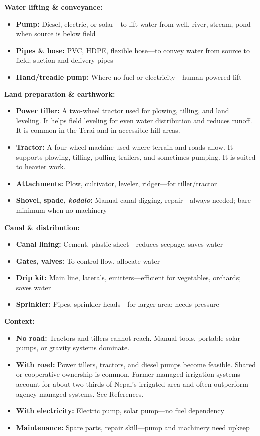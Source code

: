 \documentclass[11pt,a4paper]{article}
\begin{document}
\textbf{Water lifting \& conveyance:}
\begin{itemize}
    \item \textbf{Pump:} Diesel, electric, or solar---to lift water from well, river, stream, pond when source is below field
    \item \textbf{Pipes \& hose:} PVC, HDPE, flexible hose---to convey water from source to field; suction and delivery pipes
    \item \textbf{Hand/treadle pump:} Where no fuel or electricity---human-powered lift
\end{itemize}

\textbf{Land preparation \& earthwork:}
\begin{itemize}
    \item \textbf{Power tiller:} A two-wheel tractor used for plowing, tilling, and land leveling. It helps field leveling for 
    even water distribution and reduces runoff. It is common in the Terai and in accessible hill areas.
    \item \textbf{Tractor:} A four-wheel machine used where terrain and roads allow. It supports plowing, tilling, pulling trailers, 
    and sometimes pumping. It is suited to heavier work.
    \item \textbf{Attachments:} Plow, cultivator, leveler, ridger---for tiller/tractor
    \item \textbf{Shovel, spade, \textit{kodalo}:} Manual canal digging, repair---always needed; bare minimum when no machinery
\end{itemize}

\textbf{Canal \& distribution:}
\begin{itemize}
    \item \textbf{Canal lining:} Cement, plastic sheet---reduces seepage, saves water
    \item \textbf{Gates, valves:} To control flow, allocate water
    \item \textbf{Drip kit:} Main line, laterals, emitters---efficient for vegetables, orchards; saves water
    \item \textbf{Sprinkler:} Pipes, sprinkler heads---for larger area; needs pressure
\end{itemize}

\textbf{Context:}
\begin{itemize}
    \item \textbf{No road:} Tractors and tillers cannot reach. Manual tools, portable solar pumps, or gravity systems dominate.
    \item \textbf{With road:} Power tillers, tractors, and diesel pumps become feasible. Shared or cooperative ownership is common. 
    Farmer-managed irrigation systems account for about two-thirds of Nepal's irrigated area and often outperform agency-managed systems. See References.
    \item \textbf{With electricity:} Electric pump, solar pump---no fuel dependency
    \item \textbf{Maintenance:} Spare parts, repair skill---pump and machinery need upkeep
\end{itemize}
\end{document}
